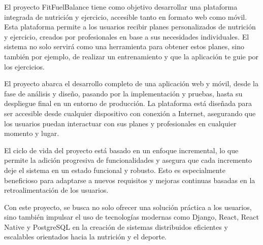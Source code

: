 El proyecto FitFuelBalance tiene como objetivo desarrollar una plataforma integrada de nutrición y ejercicio, accesible tanto en formato web como móvil. Esta plataforma permite a los usuarios recibir planes personalizados de nutrición y ejercicio, creados por profesionales en base a sus necesidades individuales. El sistema no solo servirá como una herramienta para obtener estos planes, sino también por ejemplo, de realizar un entrenamiento y que la aplicación te guie por los ejercicios.

El proyecto abarca el desarrollo completo de una aplicación web y móvil, desde la fase de análisis y diseño, pasando por la implementación y pruebas, hasta su despliegue final en un entorno de producción. La plataforma está diseñada para ser accesible desde cualquier dispositivo con conexión a Internet, asegurando que los usuarios puedan interactuar con sus planes y profesionales en cualquier momento y lugar.

El ciclo de vida del proyecto está basado en un enfoque incremental, lo que permite la adición progresiva de funcionalidades y asegura que cada incremento deje el sistema en un estado funcional y robusto. Esto es especialmente beneficioso para adaptarse a nuevos requisitos y mejoras continuas basadas en la retroalimentación de los usuarios.

Con este proyecto, se busca no solo ofrecer una solución práctica a los usuarios, sino también impulsar el uso de tecnologías modernas como Django, React, React Native y PostgreSQL en la creación de sistemas distribuidos eficientes y escalables orientados hacia la nutrición y el deporte.